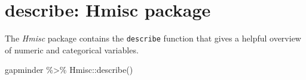 \documentclass[
]{book}
\newenvironment{Shaded}{\begin{snugshade}}{\end{snugshade}}
\newcommand{\FunctionTok}[1]{\textcolor[rgb]{0.00,0.00,0.00}{#1}}
\newcommand{\NormalTok}[1]{#1}
\newcommand{\SpecialCharTok}[1]{\textcolor[rgb]{0.00,0.00,0.00}{#1}}
\begin{document}
\hypertarget{describe-hmisc-package}{%
\section{describe: Hmisc package}\label{describe-hmisc-package}}

The \emph{Hmisc} package contains the \texttt{describe} function that gives a helpful overview of numeric and categorical variables.

\begin{Shaded}
\begin{Highlighting}[]
\NormalTok{gapminder }\SpecialCharTok{\%\textgreater{}\%} 
\NormalTok{  Hmisc}\SpecialCharTok{::}\FunctionTok{describe}\NormalTok{() }
\end{Highlighting}
\end{Shaded}
\end{document}
